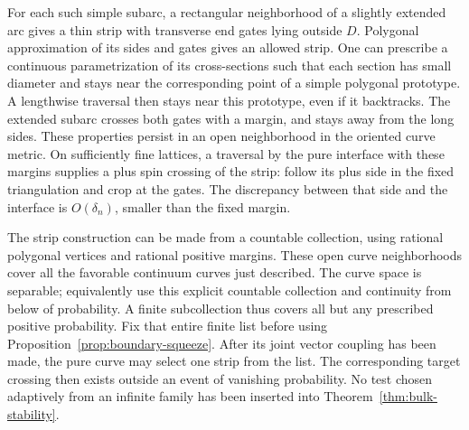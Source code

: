 For each such simple subarc, a rectangular neighborhood of a slightly
extended arc gives a thin strip with transverse end gates lying outside
$D$.  Polygonal approximation of its sides and gates gives an allowed
strip.  One can prescribe a continuous parametrization of its
cross-sections such that each section has small diameter and stays near
the corresponding point of a simple polygonal prototype.  A lengthwise
traversal then stays near this prototype, even if it backtracks.  The
extended subarc crosses both gates with a margin, and stays away from
the long sides.  These properties persist in an open neighborhood in
the oriented curve metric.  On sufficiently fine lattices, a traversal
by the pure interface with these margins supplies a plus spin crossing
of the strip: follow its plus side in the fixed triangulation and crop
at the gates.  The discrepancy between that side and the interface is
$O(\delta_n)$, smaller than the fixed margin.

The strip construction can be made from a countable collection, using
rational polygonal vertices and rational positive margins.  These open
curve neighborhoods cover all the favorable continuum curves just
described.  The curve space is separable; equivalently use this explicit
countable collection and continuity from below of probability.  A finite
subcollection thus covers all but any prescribed positive probability.
Fix that entire finite list before using
Proposition~\ref{prop:boundary-squeeze}.  After its joint vector coupling
has been made, the pure curve may select one strip from the list.  The
corresponding target crossing then exists outside an event of vanishing
probability.  No test chosen adaptively from an infinite family has
been inserted into Theorem~\ref{thm:bulk-stability}.

